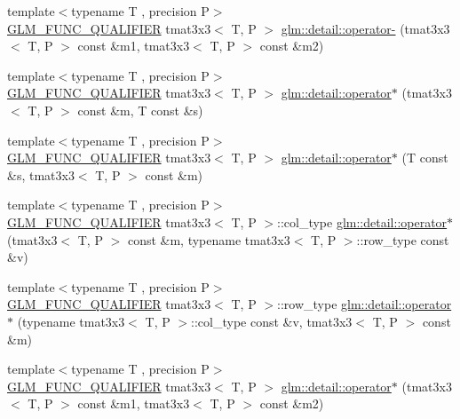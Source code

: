 \begin{DoxyCompactItemize}
\item 
{\footnotesize template$<$typename T , precision P$>$ }\\\hyperlink{setup_8hpp_a33fdea6f91c5f834105f7415e2a64407}{G\+L\+M\+\_\+\+F\+U\+N\+C\+\_\+\+Q\+U\+A\+L\+I\+F\+I\+ER} tmat3x3$<$ T, P $>$ \hyperlink{namespaceglm_1_1detail_a387ce65b779d90c741465a4c2d233859}{glm\+::detail\+::operator-\/} (tmat3x3$<$ T, P $>$ const \&m1, tmat3x3$<$ T, P $>$ const \&m2)
\item 
{\footnotesize template$<$typename T , precision P$>$ }\\\hyperlink{setup_8hpp_a33fdea6f91c5f834105f7415e2a64407}{G\+L\+M\+\_\+\+F\+U\+N\+C\+\_\+\+Q\+U\+A\+L\+I\+F\+I\+ER} tmat3x3$<$ T, P $>$ \hyperlink{namespaceglm_1_1detail_a6f46063304c787afd22a37478dc370f7}{glm\+::detail\+::operator$\ast$} (tmat3x3$<$ T, P $>$ const \&m, T const \&s)
\item 
{\footnotesize template$<$typename T , precision P$>$ }\\\hyperlink{setup_8hpp_a33fdea6f91c5f834105f7415e2a64407}{G\+L\+M\+\_\+\+F\+U\+N\+C\+\_\+\+Q\+U\+A\+L\+I\+F\+I\+ER} tmat3x3$<$ T, P $>$ \hyperlink{namespaceglm_1_1detail_a76dd2340ba202e18754d54adc47f68ea}{glm\+::detail\+::operator$\ast$} (T const \&s, tmat3x3$<$ T, P $>$ const \&m)
\item 
{\footnotesize template$<$typename T , precision P$>$ }\\\hyperlink{setup_8hpp_a33fdea6f91c5f834105f7415e2a64407}{G\+L\+M\+\_\+\+F\+U\+N\+C\+\_\+\+Q\+U\+A\+L\+I\+F\+I\+ER} tmat3x3$<$ T, P $>$\+::col\+\_\+type \hyperlink{namespaceglm_1_1detail_abe77715ce2fe6400bda7df411f87e6c6}{glm\+::detail\+::operator$\ast$} (tmat3x3$<$ T, P $>$ const \&m, typename tmat3x3$<$ T, P $>$\+::row\+\_\+type const \&v)
\item 
{\footnotesize template$<$typename T , precision P$>$ }\\\hyperlink{setup_8hpp_a33fdea6f91c5f834105f7415e2a64407}{G\+L\+M\+\_\+\+F\+U\+N\+C\+\_\+\+Q\+U\+A\+L\+I\+F\+I\+ER} tmat3x3$<$ T, P $>$\+::row\+\_\+type \hyperlink{namespaceglm_1_1detail_a471771368148da246b40ef6f72dd8d13}{glm\+::detail\+::operator$\ast$} (typename tmat3x3$<$ T, P $>$\+::col\+\_\+type const \&v, tmat3x3$<$ T, P $>$ const \&m)
\item 
{\footnotesize template$<$typename T , precision P$>$ }\\\hyperlink{setup_8hpp_a33fdea6f91c5f834105f7415e2a64407}{G\+L\+M\+\_\+\+F\+U\+N\+C\+\_\+\+Q\+U\+A\+L\+I\+F\+I\+ER} tmat3x3$<$ T, P $>$ \hyperlink{namespaceglm_1_1detail_a0dfb7c42d780d24fd78a41c02bfea215}{glm\+::detail\+::operator$\ast$} (tmat3x3$<$ T, P $>$ const \&m1, tmat3x3$<$ T, P $>$ const \&m2)

\end{DoxyCompactItemize}
